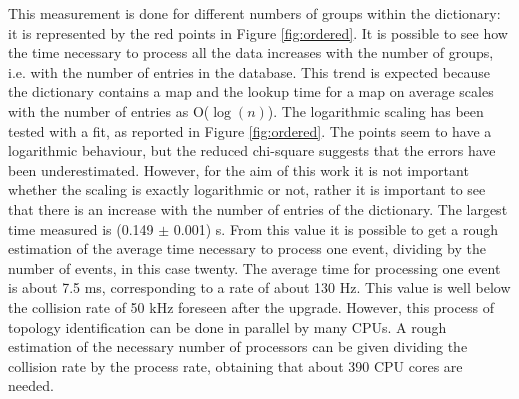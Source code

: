 %
This measurement is done for different numbers of groups within the dictionary: it is represented by the red points in Figure \ref{fig:ordered}. It is possible to see how the time necessary to process all the data increases with the number of groups, i.e. with the number of entries in the database. This trend is expected because the dictionary contains a map and the lookup time for a map on average scales with the number of entries as O($\log(n)$). The logarithmic scaling has been tested with a fit, as reported in Figure \ref{fig:ordered}. The points seem to have a logarithmic behaviour, but the reduced chi-square suggests that the errors have been underestimated. However, for the aim of this work it is not important whether the scaling is exactly logarithmic or not, rather it is important to see that there is an increase with the number of entries of the dictionary.   
The largest time measured is (0.149 $\pm$ 0.001) s. From this value it is possible to get a rough estimation of the average time necessary to process one event, dividing by the number of events, in this case twenty. The average time for processing one event is about 7.5 ms, corresponding to a rate of about 130 Hz. This value is well below the collision rate of 50 kHz foreseen after the upgrade. However, this process of topology identification can be done in parallel by many CPUs. A rough estimation of the necessary number of processors can be given dividing the collision rate by the process rate, obtaining that about 390 CPU cores are needed. %
